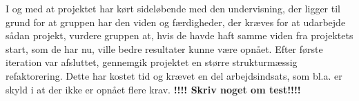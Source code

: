 I og med at projektet har kørt sideløbende med den undervisning, der ligger til grund for at gruppen har den viden og færdigheder, der kræves for at udarbejde sådan projekt, vurdere gruppen at, hvis de havde haft samme viden fra projektets start, som de har nu, ville bedre resultater kunne være opnået. Efter første iteration var afsluttet, gennemgik projektet en større strukturmæssig refaktorering. Dette har kostet tid og krævet en del arbejdsindsats, som bl.a. er skyld i at der ikke er opnået flere krav. 
\textbf{!!!! Skriv noget om test!!!!}